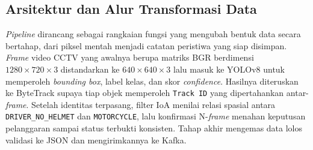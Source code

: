 % 
\subsection{Arsitektur dan Alur Transformasi Data}
\label{subsec:arsitektur-alur}

\textit{Pipeline} dirancang sebagai rangkaian fungsi yang mengubah bentuk data secara bertahap, dari piksel mentah menjadi catatan peristiwa yang siap disimpan. \textit{Frame} video CCTV yang awalnya berupa matriks BGR berdimensi $1280 \times 720 \times 3$ distandarkan ke $640 \times 640 \times 3$ lalu masuk ke YOLOv8 untuk memperoleh \textit{bounding box}, label kelas, dan skor \textit{confidence}. Hasilnya diteruskan ke ByteTrack supaya tiap objek memperoleh \texttt{Track ID} yang dipertahankan antar-\textit{frame}. Setelah identitas terpasang, filter IoA menilai relasi spasial antara \texttt{DRIVER\_NO\_HELMET} dan \texttt{MOTORCYCLE}, lalu konfirmasi N-\textit{frame} menahan keputusan pelanggaran sampai status terbukti konsisten. Tahap akhir mengemas data lolos validasi ke JSON dan mengirimkannya ke Kafka.

